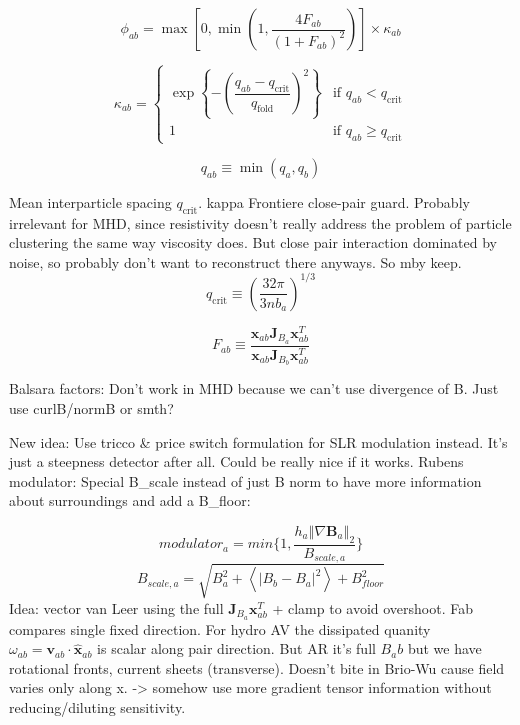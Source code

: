 \begin{equation}
\phi_{ab} = \max\left[0, \min\left(1, \frac{4F_{ab}}{(1 + F_{ab})^2}\right)\right] \times \kappa_{ab}
\end{equation}

\begin{equation}
\kappa_{ab} = \begin{cases} \exp\left\{-\left(\dfrac{q_{ab} - q_\text{crit}}{q_\text{fold}}\right)^2\right\} & \text{if } q_{ab} < q_\text{crit} \\ 1 & \text{if } q_{ab} \geq q_\text{crit} \end{cases}
\end{equation}

\begin{equation}
q_{ab} \equiv \min(q_a, q_b)
\end{equation}

Mean interparticle spacing $q_\text{crit}$. kappa Frontiere close-pair guard. Probably irrelevant for MHD, since resistivity doesn't really address the problem of particle clustering the same way viscosity does. But close pair interaction dominated by noise, so probably don't want to reconstruct there anyways. So mby keep. 
\begin{equation}
q_\text{crit} \equiv \left(\frac{32\pi}{3 n b_a}\right)^{1/3}
\end{equation}

\begin{equation}
F_{ab} \equiv \frac{\mathbf{x}_{ab} \mathbf{J}_{B_a} \mathbf{x}^T_{ab}}{\mathbf{x}_{ab} \mathbf{J}_{B_b} \mathbf{x}^T_{ab}}
\end{equation}

Balsara factors: Don't work in MHD because we can't use divergence of B. Just use curlB/normB or smth? 

New idea: Use tricco \& price switch formulation for SLR modulation instead. It's just a steepness detector after all. Could be really nice if it works. Rubens modulator: Special B\_scale instead of just B norm to have more information about surroundings and add a B\_floor: 

\begin{equation}
    modulator_a = min\{ 1, \frac{h_a \left\Vert \nabla\mathbf{B}_a \right\Vert_2}{B_{scale,a}}\}
\end{equation}
\begin{equation}
    B_{scale,a} = \sqrt{B_a^2 + \left< |B_b - B_a|^2 \right> + B_{floor}^2}
\end{equation}
Idea: vector van Leer using the full $\mathbf{J}_{B_a}\mathbf{x}_{ab}^T$ + clamp to avoid overshoot. Fab compares single fixed direction. For hydro AV the dissipated quanity $\omega_{ab}=\mathbf{v}_{ab}\cdot\hat{\mathbf{x}}_{ab}$ is scalar along pair direction. But AR it's full $B_ab$ but we have rotational fronts, current sheets (transverse). Doesn't bite in Brio-Wu cause field varies only along x. -> somehow use more gradient tensor information without reducing/diluting sensitivity. 

